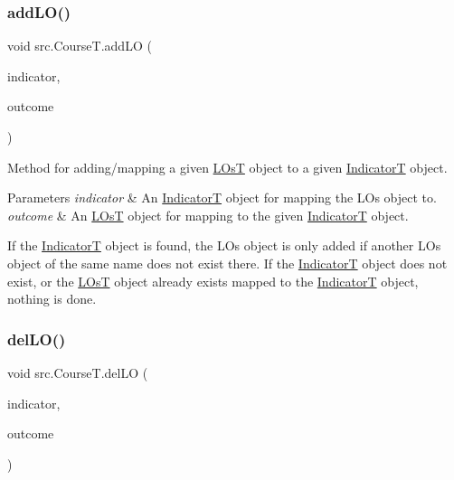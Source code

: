 \subsubsection{\texorpdfstring{add\+L\+O()}{addLO()}}
{\footnotesize\ttfamily void src.\+Course\+T.\+add\+LO (\begin{DoxyParamCaption}\item[{\hyperlink{enumsrc_1_1IndicatorT}{IndicatorT}}]{indicator,  }\item[{\hyperlink{classsrc_1_1LOsT}{L\+OsT}}]{outcome }\end{DoxyParamCaption})}



Method for adding/mapping a given \hyperlink{classsrc_1_1LOsT}{L\+OsT} object to a given \hyperlink{enumsrc_1_1IndicatorT}{IndicatorT} object. 


\begin{DoxyParams}{Parameters}
{\em indicator} & An \hyperlink{enumsrc_1_1IndicatorT}{IndicatorT} object for mapping the L\+Os object to. \\
\hline
{\em outcome} & An \hyperlink{classsrc_1_1LOsT}{L\+OsT} object for mapping to the given \hyperlink{enumsrc_1_1IndicatorT}{IndicatorT} object.\\
\hline
\end{DoxyParams}
If the \hyperlink{enumsrc_1_1IndicatorT}{IndicatorT} object is found, the L\+Os object is only added if another L\+Os object of the same name does not exist there. If the \hyperlink{enumsrc_1_1IndicatorT}{IndicatorT} object does not exist, or the \hyperlink{classsrc_1_1LOsT}{L\+OsT} object already exists mapped to the \hyperlink{enumsrc_1_1IndicatorT}{IndicatorT} object, nothing is done. \mbox{\label{classsrc_1_1CourseT_af325e1768e2368bb4588f13ac075cd2c}} 
\subsubsection{\texorpdfstring{del\+L\+O()}{delLO()}}
{\footnotesize\ttfamily void src.\+Course\+T.\+del\+LO (\begin{DoxyParamCaption}\item[{\hyperlink{enumsrc_1_1IndicatorT}{IndicatorT}}]{indicator,  }\item[{\hyperlink{classsrc_1_1LOsT}{L\+OsT}}]{outcome }\end{DoxyParamCaption})}



